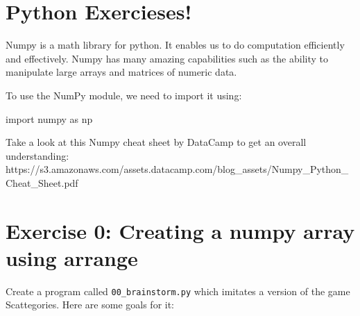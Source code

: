 \documentclass{42-en}
\begin{document}
\startexercices


\chapter{Python Exercieses!}


Numpy is a math library for python. It enables us to do computation efficiently and effectively. Numpy has many amazing capabilities such as the ability to manipulate large arrays and matrices of numeric data.

To use the NumPy module, we need to import it using:

\begin{42console}
import numpy as np

\end{42console}

Take a look at this Numpy cheat sheet by DataCamp to get an overall understanding:
https://s3.amazonaws.com/assets.datacamp.com/blog_assets/Numpy_Python_Cheat_Sheet.pdf 


\chapter{Exercise 0: Creating a numpy array using arrange}
\makeheaderfiles

Create a program called \texttt{00\_brainstorm.py} which imitates a version of the game Scattegories. Here are some goals for it:
\end{document}
